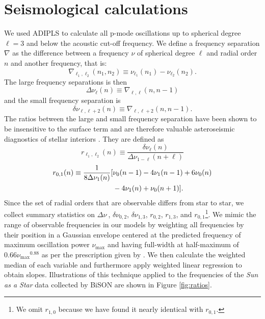 \documentclass[a4paper,fleqn,usenatbib,useAMS]{mnras}
\newcommand{\Dnu}{\ensuremath{\Delta\nu \ }}
\begin{document}
\section{Seismological calculations}
\label{sec:seis}
We used ADIPLS \citep{2008Ap&SS.316..113C} to calculate all p-mode oscillations up to spherical degree $\ell=3$ and below the acoustic cut-off frequency. We define a frequency separation $\nabla$ as the difference between a frequency $\nu$ of spherical degree $\ell$ and radial order $n$ and another frequency, that is:
\begin{equation} 
  \nabla_{\ell_1, \ell_2}(n_1, n_2) \equiv \nu_{\ell_1}(n_1) - \nu_{\ell_2}(n_2).
\end{equation}
The large frequency separations is then
\begin{equation} 
  \Delta\nu_\ell(n) \equiv \nabla_{\ell, \ell}(n, n-1)
\end{equation}
and the small frequency separation is
\begin{equation}
  \delta\nu_{\ell, \ell+2}(n) \equiv \nabla_{\ell, \ell+2}(n, n-1).
\end{equation}
The ratios between the large and small frequency separation have been shown to be insensitive to the surface term and are therefore valuable asteroseismic diagnostics of stellar interiors \citep{2003A&A...411..215R}. They are defined as
\begin{equation} 
  r_{\ell_1,\ell_2}(n) \equiv \frac{\delta\nu_\ell(n)}{\Delta\nu_{1-\ell}(n+\ell)}
\end{equation}
\begin{align} 
  r_{0, 1}(n) \equiv \frac{1}{8\Delta\nu_{1}(n)} [&\nu_0(n-1) - 4\nu_1(n-1) + 6\nu_0(n) \notag\\
  & - 4\nu_1(n) + \nu_0(n+1)] .
\end{align}
Since the set of radial orders that are observable differs from star to star, we collect summary statistics on $\Dnu$, $\delta\nu_{0,2}$, $\delta\nu_{1,3}$, $r_{0,2}$, $r_{1,3}$, and $r_{0,1}$\footnote{We omit $r_{1,0}$ because we have found it nearly identical with $r_{0,1}$.}. We mimic the range of observable frequencies in our models by weighting all frequencies by their position in a Gaussian envelope centered at the predicted frequency of maximum oscillation power $\nu_{\max}$ and having full-width at half-maximum of $0.66\nu_{\max}{}^{0.88}$ as per the prescription given by \citet{2012A&A...537A..30M}. We then calculate the weighted median of each variable and furthermore apply weighted linear regression to obtain slopes. Illustrations of this technique applied to the frequencies of the \emph{Sun as a Star} data collected by BiSON \citep{2014MNRAS.439.2025D} are shown in Figure \ref{fig:ratios}.
\end{document}
